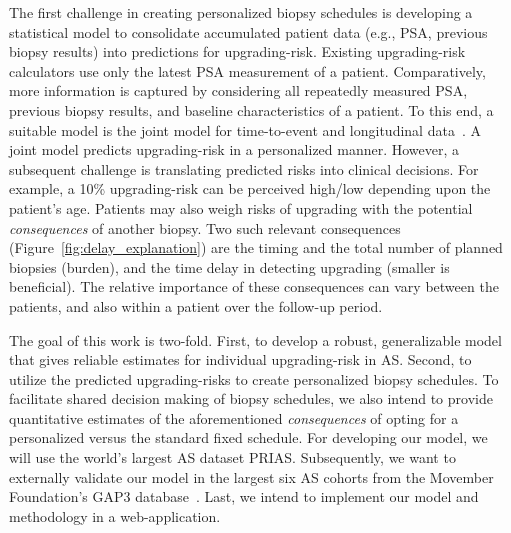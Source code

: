 The first challenge in creating personalized biopsy schedules is developing a statistical model to consolidate accumulated patient data (e.g., PSA, previous biopsy results) into predictions for upgrading-risk. Existing upgrading-risk~\citep{partin1993use,makarov2007updated} calculators use only the latest PSA measurement of a patient. Comparatively, more information is captured by considering all repeatedly measured PSA, previous biopsy results, and baseline characteristics of a patient. To this end, a suitable model is the joint model for time-to-event and longitudinal data~\citep{tomer2019, coley2017prediction,rizopoulos2012joint}. A joint model predicts upgrading-risk in a personalized manner. However, a subsequent challenge is translating predicted risks into clinical decisions. For example, a 10\% upgrading-risk can be perceived high/low depending upon the patient's age. Patients may also weigh risks of upgrading with the potential \textit{consequences} of another biopsy. Two such relevant consequences (Figure~\ref{fig:delay_explanation}) are the timing and the total number of planned biopsies (burden), and the time delay in detecting upgrading (smaller is beneficial). The relative importance of these consequences can vary between the patients, and also within a patient over the follow-up period.

The goal of this work is two-fold. First, to develop a robust, generalizable model that gives reliable estimates for individual upgrading-risk in AS. Second, to utilize the predicted upgrading-risks to create personalized biopsy schedules. To facilitate shared decision making of biopsy schedules, we also intend to provide quantitative estimates of the aforementioned \textit{consequences} of opting for a personalized versus the standard fixed schedule. For developing our model, we will use the world's largest AS dataset PRIAS. Subsequently, we want to externally validate our model in the largest six AS cohorts from the Movember Foundation's GAP3 database~\citep{gap3_2018}. Last, we intend to implement our model and methodology in a web-application.